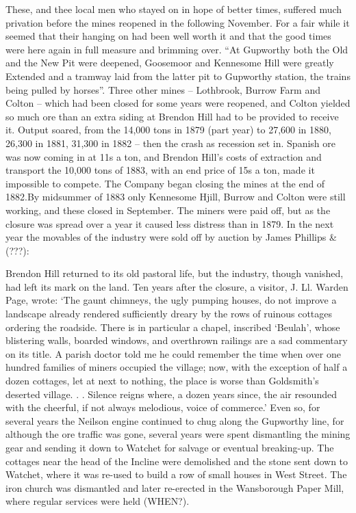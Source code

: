 \documentclass[11pt]{book}
\begin{document}
These, and thee local men who stayed on in hope of better times, suffered much privation before the mines reopened in the following November. 
       For a fair while it seemed that their hanging on had been well worth it and that the good times were here again in full measure and brimming over. “At Gupworthy both the Old and the New Pit were deepened, Goosemoor and Kennesome Hill were greatly
Extended and a tramway laid from the latter pit to Gupworthy station, the trains being pulled by horses”. Three other mines – Lothbrook, Burrow Farm and Colton – which had been closed for some years were reopened, and Colton yielded so much ore than an extra siding at Brendon Hill had to be provided to receive it.               
         Output soared, from the 14,000 tons in 1879 (part year) to 27,600 in 1880, 26,300 in 1881, 31,300 in 1882 – then the crash as recession set in. Spanish ore was now coming in at 11s a ton, and Brendon Hill’s costs of extraction and transport the 10,000 tons of 1883, with an end price of 15s a ton, made it impossible to compete. The Company began closing the mines at the end of 1882.By midsummer of 1883 only Kennesome Hjill, Burrow and Colton were still working, and these closed in September. The miners were paid off, but as the closure was spread over a year it caused less distress than in 1879.
     In the next year the movables of the industry were sold off by auction by James Phillips \& (???): 

    Brendon Hill returned to its old pastoral life, but the industry, though vanished, had left its mark on the land. Ten years after the closure, a visitor, J. Ll. Warden Page, wrote: ‘The gaunt chimneys, the ugly pumping houses, do not improve a landscape already rendered sufficiently dreary by the rows of ruinous cottages ordering the roadside. There is in particular a chapel, inscribed ‘Beulah’, whose blistering walls, boarded windows, and overthrown railings are a sad commentary on its title.  A parish doctor told me he could remember the time when over one hundred families of miners occupied the village; now, with the exception of half a dozen cottages, let at next to nothing, the place is worse than Goldsmith’s deserted village. . . Silence reigns where, a dozen years since, the air resounded with the cheerful, if not always melodious, voice of commerce.’   
   Even so, for several years the Neilson engine continued to chug along the Gupworthy line, for although the ore traffic was gone, several years were spent dismantling the mining gear and sending it down to Watchet for salvage or eventual breaking-up. The cottages near the head of the Incline were demolished and the stone sent down to Watchet, where it was re-used to build a row of small houses in West Street. The iron church was dismantled and later re-erected in the Wansborough Paper Mill, where regular services were held (WHEN?). 
\end{document}
